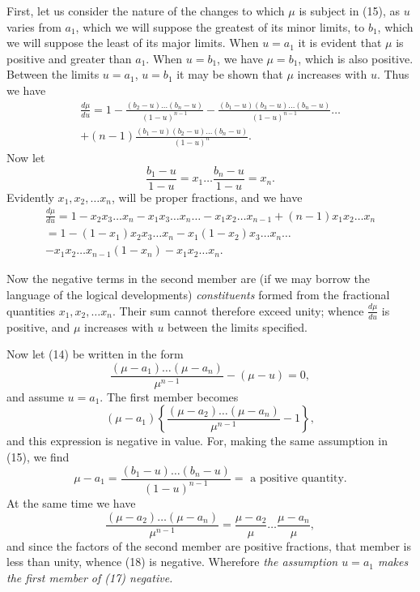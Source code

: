 \documentclass[oneside]{book}
\begin{document}
First, let us consider the nature of the changes to which $\mu$ is
subject in (15), as $u$ varies from $a_1$, which we will suppose the
greatest of its minor limits, to $b_1$, which we will suppose the least
of its major limits. When $u = a_1$ it is evident that $\mu$ is positive
and greater than $a_1$. When $u = b_1$, we have $\mu = b_1$, which is also
positive. Between the limits $u = a_1$, $u = b_1$ it may be shown
that $\mu$ increases with $u$. Thus we have
\begin{equation}\tag{16}\begin{split}
\frac{d\mu}{du}
=1-\frac{(b_2 - u)     \dotsc (b_n - u)}{(1-u)^{n-1}}
  -\frac{(b_1-u)(b_3-u)\dotsc (b_n - u)}{(1-u)^{n-1}}\dotsc \\
+ (n-1)\frac{(b_1 - u)(b_2-u)\dotsc (b_n-u)}{(1-u)^n}.
\end{split}\end{equation}
Now let
\begin{equation*}
\frac{b_1 - u}{1-u}=x_1 \dotsc \frac{b_n - u}{1-u}=x_n.
\end{equation*}
Evidently $x_1, x_2,\dotsc x_n$, will be proper fractions, and we have
\[
\begin{split}
\frac{d\mu}{du}=1 - x_2 x_3\dotsc x_n - x_1 x_3 \dotsc x_n \dotsc
- x_1 x_2 \dotsc x_{n-1} + (n-1)x_1 x_2 \dotsc x_n \\
=1 - (1-x_1)x_2 x_3 \dotsc x_n - x_1 (1-x_2)x_3 \dotsc x_n \dotsc \\
- x_1 x_2 \dotsc x_{n-1}(1-x_n) - x_1 x_2 \dotsc x_n.
\end{split}
\]

Now the negative terms in the second member are (if we may
borrow the language of the logical developments) \emph{constituents}
formed from the fractional quantities $x_1, x_2, \dotsc x_n$. Their sum
cannot therefore exceed unity; whence $\displaystyle \frac{d\mu}{du}$ is positive, and $\mu$
increases with $u$ between the limits specified.

Now let (14) be written in the form
\begin{equation}\tag{17}
\frac{(\mu-a_1)\dotsc(\mu-a_n)}{\mu^{n-1}} - (\mu-u) = 0,
\end{equation}
and assume $u = a_1$. The first member becomes
\begin{equation}\tag{18}
(\mu-a_1)\left\{\frac{(\mu-a_2)\dotsc(\mu-a_n)}{\mu^{n-1}} -1\right\},
\end{equation}
and this expression is negative in value. For, making the same
assumption in (15), we find
\begin{equation*}
\mu - a_1 = \frac{(b_1 - u)\dotsc(b_n - u)}{(1-u)^{n-1}}
= \text{ a positive quantity}.
\end{equation*}
At the same time we have
\begin{equation*}
\frac{(\mu-a_2)\dotsc (\mu - a_n)}{\mu^{n-1}}
=\frac{\mu-a_2}{\mu} \dotsc \frac{\mu-a_n}{\mu},
\end{equation*}
and since the factors of the second member are positive fractions,
that member is less than unity, whence (18) is negative.
Wherefore \emph{the assumption $u = a_1$ makes the first member of (17) negative.}
\end{document}
